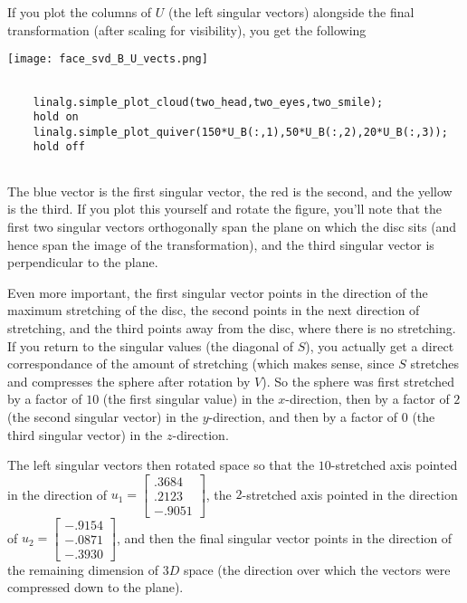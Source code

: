 \documentclass{ximera}
\begin{document}
If you plot the columns of $U$ (the left singular vectors) alongside the final transformation (after scaling for visibility), you get the following 

\begin{center}
  \texttt{[image: face\_svd\_B\_U\_vects.png]}
\end{center}

\begin{hint}
  \begin{verbatim}

    linalg.simple_plot_cloud(two_head,two_eyes,two_smile);
    hold on
    linalg.simple_plot_quiver(150*U_B(:,1),50*U_B(:,2),20*U_B(:,3));
    hold off
  
  \end{verbatim}
\end{hint}

The blue vector is the first singular vector, the red is the second, and the yellow is the third. If you plot this yourself and rotate the figure, you'll note that the first two singular vectors orthogonally span the plane on which the disc sits (and hence span the image of the transformation), and the third singular vector is perpendicular to the plane. 

Even more important, the first singular vector points in the direction of the maximum stretching of the disc, the second points in the next direction of stretching, and the third points away from the disc, where there is no stretching. If you return to the singular values (the diagonal of $S$), you actually get a direct correspondance of the amount of stretching (which makes sense, since $S$ stretches and compresses the sphere after rotation by $V$). So the sphere was first stretched by a factor of $10$ (the first singular value) in the $x$-direction, then by a factor of $2$ (the second singular vector) in the $y$-direction, and then by a factor of $0$ (the third singular vector) in the $z$-direction. 

The left singular vectors then rotated space so that the $10$-stretched axis pointed in the direction of $u_1=\begin{bmatrix}.3684\\.2123\\-.9051\end{bmatrix}$, the $2$-stretched axis pointed in the direction of $u_2=\begin{bmatrix}-.9154\\-.0871\\-.3930\end{bmatrix}$, and then the final singular vector points in the direction of the remaining dimension of $3D$ space (the direction over which the vectors were compressed down to the plane).
\end{document}
